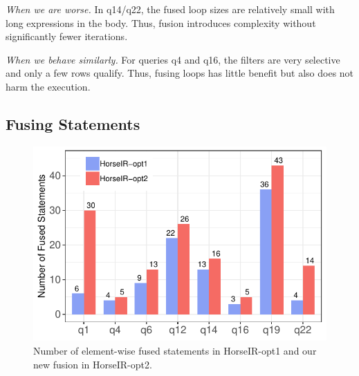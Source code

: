 \textit{When we are worse.}
In q14/q22, the fused loop sizes are relatively small with long expressions in
the body. Thus, fusion introduces complexity without significantly fewer
iterations. 

\textit{When we behave similarly.}
For queries q4 and q16, the filters are very selective and only a few rows
qualify. Thus, fusing loops has little benefit but also does not harm the
execution.






\subsection{Fusing Statements} \label{fusing_stmts}

\begin{figure}[htbp]
\centering
\includegraphics[width=.86\columnwidth]{./src/figure/bar-number.pdf}
\vspace{-3mm}
\caption{Number of element-wise fused statements in HorseIR-opt1 and our new
fusion in HorseIR-opt2.}
\label{fig:opt_number}
\end{figure}

